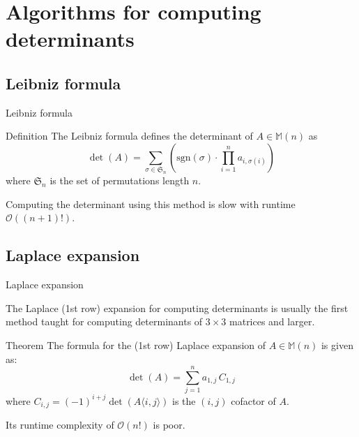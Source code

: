 \documentclass{beamer}
\begin{document}
\section{Algorithms for computing determinants}

\subsection{Leibniz formula}

\begin{frame}{Leibniz formula}

    \begin{block}{Definition}
        The Leibniz formula defines the determinant of $A \in \mathbb{M}(n)$ as
        \[
            \det(A) = \sum_{\sigma \in \mathfrak{S}_n}
            \left( \text{sgn}(\sigma) \cdot \prod_{i=1}^n a_{i,\sigma(i)} \right)
        \]
        where $\mathfrak{S}_n$ is the set of permutations length $n$.
    \end{block}

    \pause{}

    Computing the determinant using this method is slow with runtime $\mathcal{O}((n+1)!)$.

\end{frame}

\subsection{Laplace expansion}

\begin{frame}{Laplace expansion}

    The Laplace (1st row) expansion for computing determinants is usually the first method taught
    for computing determinants of $3 \times 3$ matrices and larger.

    \pause{}

    \begin{block}{Theorem}
        The formula for the (1st row) Laplace expansion of $A \in \mathbb{M}(n)$
        is given as:
        \[
            \det(A) = \sum_{j=1}^n a_{1,j}\, C_{1,j}
        \]
        where $C_{i,j} = {(-1)}^{i+j} \det{(A \langle i, j \rangle)}$ is the
        $(i, j)$ cofactor of $A$.
    \end{block}

    \pause{}

    Its runtime complexity of $\mathcal{O}(n!)$ is poor.

\end{frame}
\end{document}
